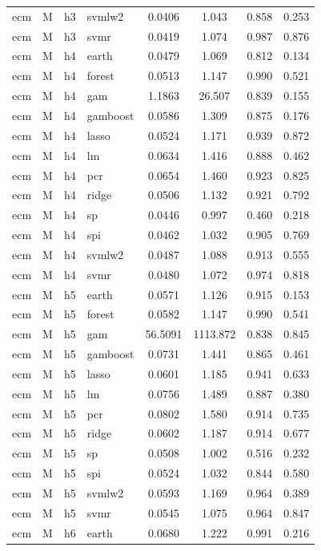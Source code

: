 \begin{ThreePartTable}
\begin{longtable}[t]{llclcccc}
ecm & M & h3 & svmlw2 & 0.0406 & 1.043 & 0.858 & 0.253\\
ecm & M & h3 & svmr & 0.0419 & 1.074 & 0.987 & 0.876\\
\addlinespace
ecm & M & h4 & earth & 0.0479 & 1.069 & 0.812 & 0.134\\
ecm & M & h4 & forest & 0.0513 & 1.147 & 0.990 & 0.521\\
ecm & M & h4 & gam & 1.1863 & 26.507 & 0.839 & 0.155\\
ecm & M & h4 & gamboost & 0.0586 & 1.309 & 0.875 & 0.176\\
ecm & M & h4 & lasso & 0.0524 & 1.171 & 0.939 & 0.872\\
ecm & M & h4 & lm & 0.0634 & 1.416 & 0.888 & 0.462\\
ecm & M & h4 & pcr & 0.0654 & 1.460 & 0.923 & 0.825\\
ecm & M & h4 & ridge & 0.0506 & 1.132 & 0.921 & 0.792\\
ecm & M & h4 & sp & 0.0446 & 0.997 & 0.460 & 0.218\\
ecm & M & h4 & spi & 0.0462 & 1.032 & 0.905 & 0.769\\
ecm & M & h4 & svmlw2 & 0.0487 & 1.088 & 0.913 & 0.555\\
ecm & M & h4 & svmr & 0.0480 & 1.072 & 0.974 & 0.818\\
\addlinespace
ecm & M & h5 & earth & 0.0571 & 1.126 & 0.915 & 0.153\\
ecm & M & h5 & forest & 0.0582 & 1.147 & 0.990 & 0.541\\
ecm & M & h5 & gam & 56.5091 & 1113.872 & 0.838 & 0.845\\
ecm & M & h5 & gamboost & 0.0731 & 1.441 & 0.865 & 0.461\\
ecm & M & h5 & lasso & 0.0601 & 1.185 & 0.941 & 0.633\\
ecm & M & h5 & lm & 0.0756 & 1.489 & 0.887 & 0.380\\
ecm & M & h5 & pcr & 0.0802 & 1.580 & 0.914 & 0.735\\
ecm & M & h5 & ridge & 0.0602 & 1.187 & 0.914 & 0.677\\
ecm & M & h5 & sp & 0.0508 & 1.002 & 0.516 & 0.232\\
ecm & M & h5 & spi & 0.0524 & 1.032 & 0.844 & 0.580\\
ecm & M & h5 & svmlw2 & 0.0593 & 1.169 & 0.964 & 0.389\\
ecm & M & h5 & svmr & 0.0545 & 1.075 & 0.964 & 0.847\\
\addlinespace
ecm & M & h6 & earth & 0.0680 & 1.222 & 0.991 & 0.216\\

\end{longtable}
\end{ThreePartTable}

